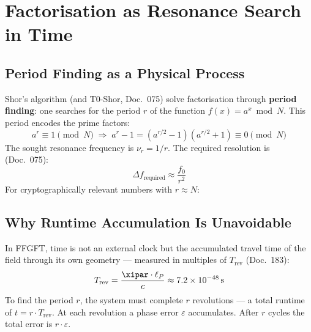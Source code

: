 \section{Factorisation as Resonance Search in Time}

\subsection{Period Finding as a Physical Process}

Shor's algorithm (and T0-Shor, Doc.~075) solve factorisation through
\textbf{period finding}: one searches for the period $r$ of the function
$f(x) = a^x \bmod N$. This period encodes the prime factors:
\begin{equation}
    a^r \equiv 1 \pmod{N}
    \;\Rightarrow\;
    a^r - 1 = (a^{r/2} - 1)(a^{r/2} + 1) \equiv 0 \pmod{N}
\end{equation}
The sought resonance frequency is $\nu_r = 1/r$. The required resolution is
(Doc.~075):
\begin{equation}
    \Delta f_\text{required} \approx \frac{f_0}{r^2}
\end{equation}
For cryptographically relevant numbers with $r \approx N$:

\begin{table}[ht]
\centering
{}
\caption{Precision barrier for factorisation (after Doc.~075)}
\end{table}

\subsection{Why Runtime Accumulation Is Unavoidable}

In FFGFT, time is not an external clock but the accumulated travel time of the
field through its own geometry — measured in multiples of $T_\text{rev}$ (Doc.~183):
\begin{equation}
    T_\text{rev} = \frac{\xipar \cdot \ell_P}{c} \approx 7.2 \times 10^{-48}\,\text{s}
\end{equation}
To find the period $r$, the system must complete $r$ revolutions — a total runtime
of $t = r \cdot T_\text{rev}$. At each revolution a phase error $\varepsilon$
accumulates. After $r$ cycles the total error is $r \cdot \varepsilon$.

